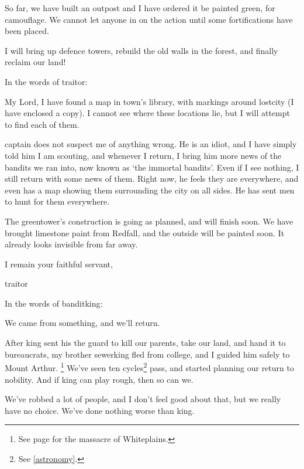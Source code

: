 \begin{multicols}{2}
\begin{exampletext}
  So far, we have built an outpost and I have ordered it be painted green, for camouflage.
  We cannot let anyone in on the action until some fortifications have been placed.
  
  I will bring up defence towers, rebuild the old walls in the forest, and finally reclaim our land!

\end{exampletext}

In the words of \gls{traitor}:

\begin{exampletext}

  My Lord,
  I have found a map in \gls{town}'s library, with markings around \gls{lostcity} (I have enclosed a copy).
  I cannot see where these locations lie, but I will attempt to find each of them.

  \Gls{captain} does not suspect me of anything wrong.
  He is an idiot, and I have simply told him I am scouting, and whenever I return, I bring him more news of the bandits we ran into, now known as `the immortal bandits'.
  Even if I see nothing, I still return with some news of them.
  Right now, he feels they are everywhere, and even has a map showing them surrounding the city on all sides.
  He has sent men to hunt for them everywhere.

  The \gls{greentower}'s construction is going as planned, and will finish soon.
  We have brought limestone paint from Redfall, and the outside will be painted soon.
  It already looks invisible from far away.

  I remain your faithful servant,

  \gls{traitor}

\end{exampletext}

In the words of \gls{banditking}:

\begin{exampletext}

  We came from something, and we'll return.

  After \gls{king} sent his the \gls{guard} to kill our parents, take our land, and hand it to bureaucrats, my brother \gls{sewerking} fled from \gls{college}, and I guided him safely to Mount Arthur.
  \footnote{See page \pageref{whiteplainsWar} for the massacre of Whiteplains.}
  We've seen ten cycles\footnote{See \autoref{astronomy}.} pass, and started planning our return to nobility.
  And if \gls{king} can play rough, then so can we.

  We've robbed a lot of people, and I don't feel good about that, but we really have no choice.
  We've done nothing worse than \gls{king}.


\end{exampletext}
\end{multicols}
